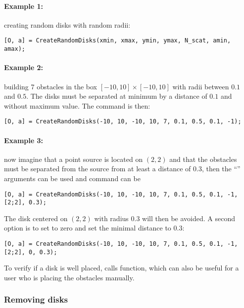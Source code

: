 \paragraph{Example 1:} creating  random disks with random radii:
\begin{verbatim}
[O, a] = CreateRandomDisks(xmin, xmax, ymin, ymax, N_scat, amin, amax);
\end{verbatim}
\paragraph{Example 2:} building 7 obstacles in the box $[-10,10]\times[-10,10]$ with radii between $0.1$ and $0.5$. The disks must be separated at minimum by a distance of $0.1$ and without maximum value. The command is then:
\begin{verbatim}
[O, a] = CreateRandomDisks(-10, 10, -10, 10, 7, 0.1, 0.5, 0.1, -1);
\end{verbatim}
\paragraph{Example 3:} now imagine that a point source is located on $(2,2)$ and that the obstacles must be separated from the source from at least a distance of $0.3$, then the ``'' arguments can be used and command can be
\begin{verbatim}
[O, a] = CreateRandomDisks(-10, 10, -10, 10, 7, 0.1, 0.5, 0.1, -1, [2;2], 0.3);
\end{verbatim}
The disk centered on $(2,2)$ with radius $0.3$ will then be avoided. A second option is to set  to zero and set the minimal distance  to $0.3$:
\begin{verbatim}
[O, a] = CreateRandomDisks(-10, 10, -10, 10, 7, 0.1, 0.5, 0.1, -1, [2;2], 0, 0.3);
\end{verbatim}


\begin{remark}
To verify if a disk is well placed,  calls  function, which can also be useful for a user who is placing the obstacles manually.
\end{remark}

\subsubsection{Removing disks}

